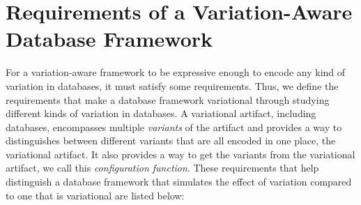 \chapter{Requirements of a Variation-Aware Database Framework}
\label{ch:req}

For a variation-aware framework  to be expressive enough to encode
any kind of variation in databases, it must satisfy some requirements.
Thus, we define the requirements that make a database framework
variational through studying different kinds of variation in databases.  
A variational artifact, including databases, encompasses multiple 
\emph{variants} of the artifact and provides a way to distinguishes 
between different variants that are all encoded in one place, the 
variational artifact. It also provides a way to get the variants from
the variational artifact, we call this \emph{configuration function}.
%
These requirements that help distinguish a database framework that 
simulates the effect of variation compared to one that is variational are
listed below:

